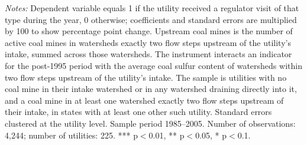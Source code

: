 \begin{table}[htbp]
{}
\begin{minipage}{\linewidth}
\vspace{4pt}
\footnotesize
\raggedright
\textit{Notes:} Dependent variable equals 1 if the utility received a regulator visit of that type during the year, 0 otherwise; coefficients and standard errors are multiplied by 100 to show percentage point change. Upstream coal mines is the number of active coal mines in watersheds exactly two flow steps upstream of the utility's intake, summed across those watersheds. The instrument interacts an indicator for the post-1995 period with the average coal sulfur content of watersheds within two flow steps upstream of the utility's intake. The sample is utilities with no coal mine in their intake watershed or in any watershed draining directly into it, and a coal mine in at least one watershed exactly two flow steps upstream of their intake, in states with at least one other such utility. Standard errors clustered at the utility level. Sample period 1985--2005. Number of observations: 4,244; number of utilities: 225. *** p$<$0.01, ** p$<$0.05, * p$<$0.1.
\end{minipage}
\end{table}
